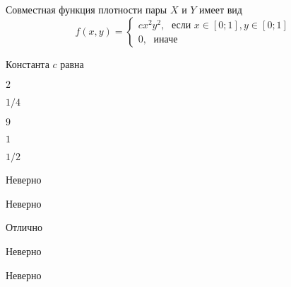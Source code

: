 
\begin{question}
Совместная функция плотности пары \(X\) и \(Y\) имеет вид \[
f(x,y)=\begin{cases}
cx^2y^2, \; \text{ если } x\in[0;1], y\in [0;1] \\
0, \; \text{ иначе}
\end{cases}
\]

\vspace{0.5cm}

Константа \(c\) равна
\begin{answerlist}
  \item \(2\)
  \item \(1/4\)
  \item \(9\)
  \item \(1\)
  \item \(1/2\)
\end{answerlist}
\end{question}

\begin{solution}
\begin{answerlist}
  \item Неверно
  \item Неверно
  \item Отлично
  \item Неверно
  \item Неверно
\end{answerlist}
\end{solution}

